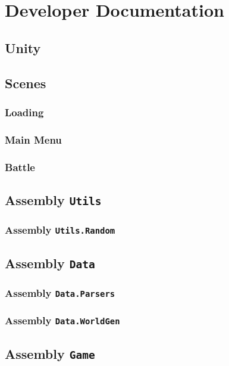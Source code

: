 \chapter{Developer Documentation}

\section{Unity}

\section{Scenes}

\subsection{Loading}

\subsection{Main Menu}

\subsection{Battle}

\section{Assembly \texttt{Utils}}

\subsection{Assembly \texttt{Utils.Random}}

\section{Assembly \texttt{Data}}

\subsection{Assembly \texttt{Data.Parsers}}

\subsection{Assembly \texttt{Data.WorldGen}}

\section{Assembly \texttt{Game}}

